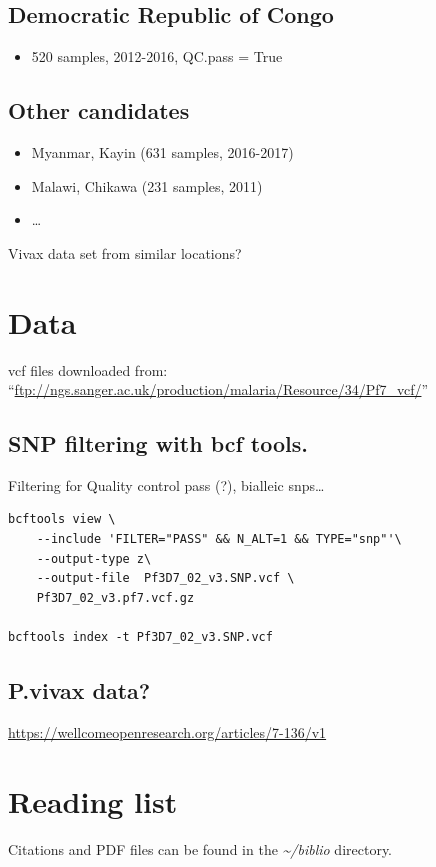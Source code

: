 \documentclass[11pt]{article}
\begin{document}
\subsection{Democratic Republic of Congo}
\label{sec:orgf4f4067}
\begin{itemize}
\item 520 samples, 2012-2016, QC.pass = True
\end{itemize}

\subsection{Other candidates}
\label{sec:org776838f}
\begin{itemize}
\item Myanmar, Kayin (631 samples, 2016-2017)
\item Malawi, Chikawa (231 samples, 2011)
\item \ldots{}
\end{itemize}
Vivax data set from similar locations?

\section{Data}
\label{sec:orgdf9091d}
vcf files downloaded from: ``\url{ftp://ngs.sanger.ac.uk/production/malaria/Resource/34/Pf7\_vcf/}''

\subsection{SNP filtering with bcf tools.}
\label{sec:orga3336f3}
Filtering for Quality control pass (?), bialleic snps\ldots{}

\begin{verbatim}
bcftools view \
    --include 'FILTER="PASS" && N_ALT=1 && TYPE="snp"'\
    --output-type z\
    --output-file  Pf3D7_02_v3.SNP.vcf \
    Pf3D7_02_v3.pf7.vcf.gz

bcftools index -t Pf3D7_02_v3.SNP.vcf
\end{verbatim}

\subsection{P.vivax data?}
\label{sec:org992a538}
\url{https://wellcomeopenresearch.org/articles/7-136/v1}

\section{Reading list}
\label{sec:org8d0bed9}
Citations and PDF files can be found in the \emph{\textasciitilde{}/biblio} directory.
\end{document}
